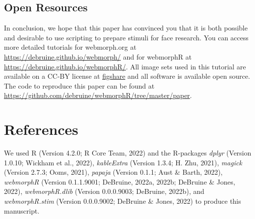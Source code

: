 \documentclass[
  man,floatsintext]{apa6}
\begin{document}
\hypertarget{open-resources}{%
\subsection{Open Resources}\label{open-resources}}

In conclusion, we hope that this paper has convinced you that it is both possible and desirable to use scripting to prepare stimuli for face research. You can access more detailed tutorials for webmorph.org at \url{https://debruine.github.io/webmorph/} and for webmorphR at \url{https://debruine.github.io/webmorphR/}. All image sets used in this tutorial are available on a CC-BY license at \href{https://figshare.com/search?q=webmorph\%20psychomorph}{figshare} and all software is available open source. The code to reproduce this paper can be found at \url{https://github.com/debruine/webmorphR/tree/master/paper}.

\newpage

\hypertarget{references}{%
\section{References}\label{references}}

We used R (Version 4.2.0; R Core Team, 2022) and the R-packages \emph{dplyr} (Version 1.0.10; Wickham et al., 2022), \emph{kableExtra} (Version 1.3.4; H. Zhu, 2021), \emph{magick} (Version 2.7.3; Ooms, 2021), \emph{papaja} (Version 0.1.1; Aust \& Barth, 2022), \emph{webmorphR} (Version 0.1.1.9001; DeBruine, 2022a, 2022b; DeBruine \& Jones, 2022), \emph{webmorphR.dlib} (Version 0.0.0.9003; DeBruine, 2022b), and \emph{webmorphR.stim} (Version 0.0.0.9002; DeBruine \& Jones, 2022) to produce this manuscript.

\begingroup
\setlength{\parindent}{-0.5in}
\setlength{\leftskip}{0.5in}
\end{document}
